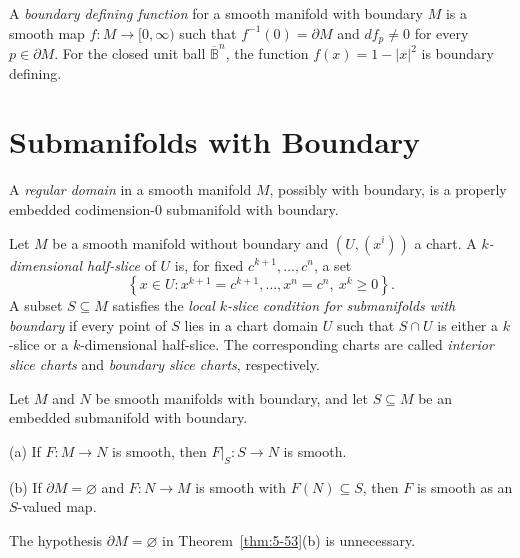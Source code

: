 \begin{definition}
\label{def:5-35-extra-3}
\leanok
A \emph{boundary defining function} for a smooth manifold with boundary $M$ is
a smooth map $f:M\to[0,\infty)$ such that $f^{-1}(0)=\partial M$ and
$df_p\neq0$ for every $p\in\partial M$. For the closed unit ball
$\overline{\mathbb B}^n$, the function $f(x)=1-|x|^2$ is boundary defining.
\end{definition}


\section{Submanifolds with Boundary}

\begin{definition}
\label{def:5-36-extra-2}
\leanok
A \emph{regular domain} in a smooth manifold $M$, possibly with boundary, is a
properly embedded codimension-$0$ submanifold with boundary.
\end{definition}

\begin{definition}
\label{def:5-36-extra-4}
\leanok
Let $M$ be a smooth manifold without boundary and $(U,(x^i))$ a chart. A
\emph{$k$-dimensional half-slice} of $U$ is, for fixed
$c^{k+1},\ldots,c^n$, a set
\[
\left\{x\in U:x^{k+1}=c^{k+1},\ldots,x^n=c^n,\ x^k\geq0\right\}.
\]
A subset $S\subseteq M$ satisfies the \emph{local $k$-slice condition for
submanifolds with boundary} if every point of $S$ lies in a chart domain $U$
such that $S\cap U$ is either a $k$-slice or a $k$-dimensional half-slice. The
corresponding charts are called \emph{interior slice charts} and
\emph{boundary slice charts}, respectively.
\end{definition}


\begin{theorem}
\label{thm:5-53}
\leanok
{}
Let $M$ and $N$ be smooth manifolds with boundary, and let $S\subseteq M$ be an
embedded submanifold with boundary.

(a) If $F:M\to N$ is smooth, then $F|_S:S\to N$ is smooth.

(b) If $\partial M=\varnothing$ and $F:N\to M$ is smooth with $F(N)\subseteq
S$, then $F$ is smooth as an $S$-valued map.
\end{theorem}

\begin{remark}
\label{rem:5-36-extra-5}
\leanok
The hypothesis $\partial M=\varnothing$ in Theorem~\ref{thm:5-53}(b) is
unnecessary.
\end{remark}
